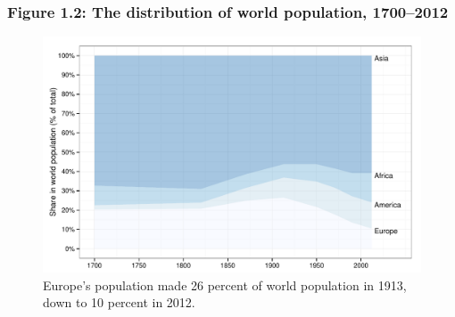 \documentclass[t]{beamer}\usepackage[]{graphicx}\usepackage[]{color}
\newenvironment{knitrout}{}{} %
\begin{document}
\begin{frame}[label=Figure_1_2]
\frametitle{Figure 1.2: The distribution of world population, 1700--2012}
\begin{figure}[t]
\begin{minipage}[b]{\textwidth}
\centering
\begin{knitrout}\footnotesize
{}\color{fgcolor}

{\centering \includegraphics[width=1\linewidth]{figures/color/Figure_1_2} 

}



\end{knitrout}
\caption{Europe's population made 26 percent of world population in 1913, down to 10 percent in 2012.}
\end{minipage}
\end{figure}
\end{frame}
\end{document}
